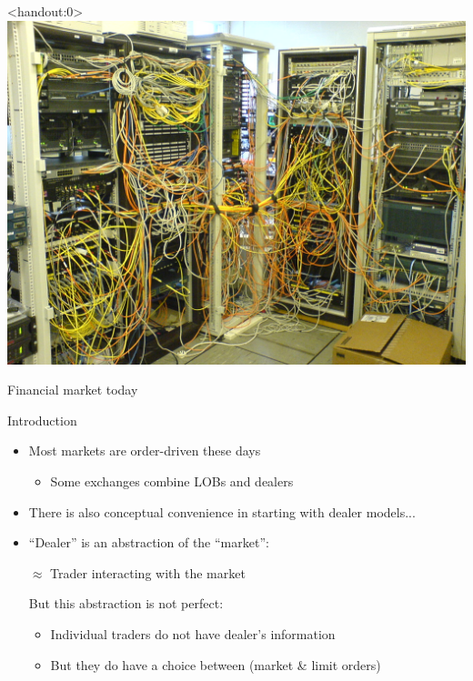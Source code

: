 \documentclass[english,10pt
,aspectratio=169
]{beamer}
\begin{document}
\begin{frame}<handout:0>
	\centering
	\includegraphics[scale=0.19]{pics/mkt21}
	
	Financial market today
\end{frame}


\begin{frame}{Introduction}
	\begin{itemize}
		\item Most markets are order-driven these days
		\begin{itemize}
			\item Some exchanges combine LOBs and dealers
		\end{itemize}
		\item There is also conceptual convenience in starting with dealer models...
		\item ``Dealer'' is an abstraction of the ``market'':
		\begin{center}
			 $\approx$ \alert{Trader interacting with the market}
		\end{center}
		But this abstraction is not perfect:
		\begin{itemize}
			\item Individual traders \alert{do not have dealer's information}
			\item But they do have a choice between  (market \& limit orders)
		\end{itemize}
	\end{itemize}
\end{frame}
\end{document}
